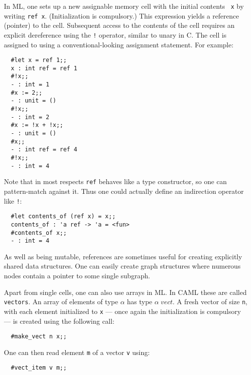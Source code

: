 In ML, one sets up a new assignable memory cell with the initial contents {\tt
x} by writing {\tt ref x}. (Initialization is compulsory.) This expression
yields a reference (pointer) to the cell. Subsequent access to the contents of
the cell requires an explicit dereference using the {\tt !} operator, similar
to unary {\tt *} in C. The cell is assigned to using a conventional-looking
assignment statement. For example:

\begin{boxed}\begin{verbatim}
  #let x = ref 1;;
  x : int ref = ref 1
  #!x;;
  - : int = 1
  #x := 2;;
  - : unit = ()
  #!x;;
  - : int = 2
  #x := !x + !x;;
  - : unit = ()
  #x;;
  - : int ref = ref 4
  #!x;;
  - : int = 4
\end{verbatim}\end{boxed}

Note that in most respects {\tt ref} behaves like a type constructor, so one
can pattern-match against it. Thus one could actually define an indirection
operator like {\tt !}:

\begin{boxed}\begin{verbatim}
  #let contents_of (ref x) = x;;
  contents_of : 'a ref -> 'a = <fun>
  #contents_of x;;
  - : int = 4
\end{verbatim}\end{boxed}

As well as being mutable, references are sometimes useful for creating
explicitly shared data structures. One can easily create graph structures where
numerous nodes contain a pointer to some single subgraph.

Apart from single cells, one can also use arrays in ML. In CAML these are
called {\tt vectors}. An array of elements of type $\alpha$ has type
$\alpha\; vect$. A fresh vector of size {\tt n}, with each element initialized
to {\tt x} --- once again the initialization is compulsory --- is created using
the following call:

\begin{boxed}\begin{verbatim}
  #make_vect n x;;
\end{verbatim}\end{boxed}

\noindent One can then read element {\tt m} of a vector {\tt v} using:

\begin{boxed}\begin{verbatim}
  #vect_item v m;;
\end{verbatim}\end{boxed}

